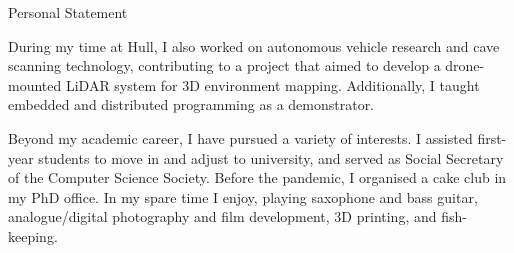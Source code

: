 \documentclass{cv}
\begin{document}
\begin{rSection}{Personal Statement}
        \item During my time at Hull, I also worked on autonomous vehicle research and cave scanning technology, contributing to a project that aimed to develop a drone-mounted LiDAR system for 3D environment mapping. Additionally, I taught embedded and distributed programming as a demonstrator.

        \item Beyond my academic career, I have pursued a variety of interests. I assisted first-year students to move in and adjust to university, and served as Social Secretary of the Computer Science Society. Before the pandemic, I organised a cake club in my PhD office. In my spare time I enjoy, playing saxophone and bass guitar, analogue/digital photography and film development, 3D printing, and fish-keeping.
    \end{rSection}

    \newpage
    
\end{document}
